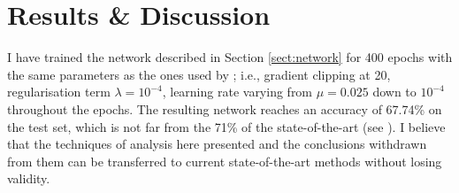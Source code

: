 \chapter{Results \& Discussion} \label{Chapter: Results}





I have trained the network described in Section \ref{sect:network} for 400 epochs with the same parameters as the ones used by \cite{Jurtz2017}; i.e., gradient clipping at 20, regularisation term $\lambda=10^{-4}$, learning rate varying from $\mu=0.025$ down to $10^{-4}$ throughout the epochs. The resulting network reaches an accuracy of 67.74\% on the test set, which is not far from the 71\% of the state-of-the-art (see ).
I believe that the techniques of analysis here presented and the conclusions withdrawn from them can be transferred to current state-of-the-art methods without losing validity.

